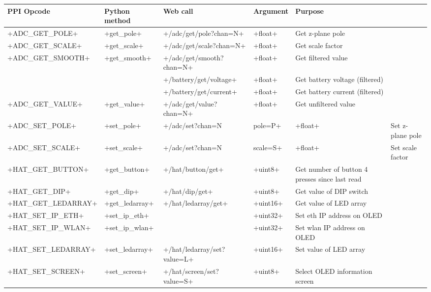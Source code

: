 \documentclass[11pt,fleqn]{article}
\begin{document}
\begin{landscape}
\setlength\LTcapwidth{\linewidth}
\begin{longtable}{|l|l|l|l|p{5cm}|}\hline
PPI Opcode &                         Python method &      Web call & Argument & Purpose \\ \hline\hline
+ADC_GET_POLE+ &           +get_pole+ &      +/adc/get/pole?chan=N+                           & +float+ & Get z-plane pole  \\
+ADC_GET_SCALE+ &         +get_scale+ &    +/adc/get/scale?chan=N+                          & +float+ & Get scale factor \\
+ADC_GET_SMOOTH+ &     +get_smooth+ & +/adc/get/smooth?chan=N+   & +float+ & Get filtered value  \\
                                        &                              & +/battery/get/voltage+ & +float+ & Get battery voltage (filtered) \\
                                        &                              & +/battery/get/current+ & +float+ & Get battery current (filtered) \\
+ADC_GET_VALUE+ &         +get_value+   &   +/adc/get/value?chan=N+                          & +float+ & Get unfiltered value \\ \hdashline
+ADC_SET_POLE+ &           +set_pole+ &       +/adc/set?chan=N&pole=P+                        & +float+ & Set z-plane pole  \\
+ADC_SET_SCALE+ &         +set_scale+ &        +/adc/set?chan=N&scale=S+                     & +float+ & Set scale factor \\ \hline
+HAT_GET_BUTTON+ &      +get_button+ & +/hat/button/get+     & +uint8+ & Get number of button 4 presses since last read \\
+HAT_GET_DIP+ &               +get_dip+ & +/hat/dip/get+               & +uint8+ & Get value of DIP switch \\
+HAT_GET_LEDARRAY+ &  +get_ledarray+ & +/hat/ledarray/get+   & +uint16+ & Get value of LED array \\ \hdashline
+HAT_SET_IP_ETH+ &         +set_ip_eth+ &                         & +uint32+ &Set eth IP address on OLED \\
+HAT_SET_IP_WLAN+ &      +set_ip_wlan+ &                       & +uint32+ & Set wlan IP address on OLED\\
+HAT_SET_LEDARRAY+ &   +set_ledarray+ & +/hat/ledarray/set?value=L+    & +uint16+ & Set value of LED array\\
+HAT_SET_SCREEN+ &       +set_screen+ & +/hat/screen/set?value=S+     & +uint8+ & Select OLED information screen \\ \hline

\end{longtable}
\end{landscape}
\end{document}
